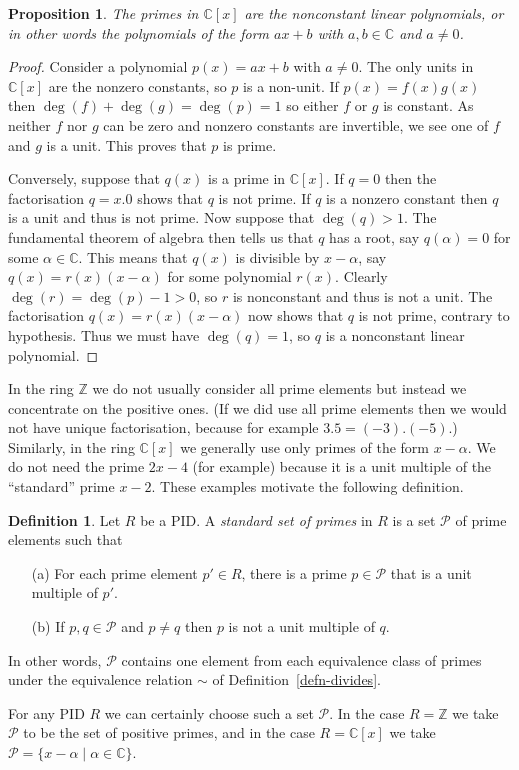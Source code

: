 \documentclass{amsart}
\newcommand{\Z}         {{\mathbb{Z}}}
\newcommand{\st}        {\;|\;}
\newcommand{\CP}        {{\mathcal{P}}}
\newcommand{\C}         {{\mathbb{C}}}
\newcommand{\al}        {\alpha}
\renewcommand{\:}{\colon}
\newtheorem{proposition}[theorem]{Proposition}
\theoremstyle{definition}
\newtheorem{definition}[theorem]{Definition}
\begin{document}
\begin{proposition}\label{prop-Cx-prime}
 The primes in $\C[x]$ are the nonconstant linear polynomials, or in
 other words the polynomials of the form $ax+b$ with $a,b\in\C$ and
 $a\neq 0$.
\end{proposition}
\begin{proof}
 Consider a polynomial $p(x)=ax+b$ with $a\neq 0$.  The only units in
 $\C[x]$ are the nonzero constants, so $p$ is a non-unit.  If
 $p(x)=f(x)g(x)$ then $\deg(f)+\deg(g)=\deg(p)=1$ so either $f$ or $g$
 is constant.  As neither $f$ nor $g$ can be zero and nonzero
 constants are invertible, we see one of $f$ and $g$ is a unit.  This
 proves that $p$ is prime.

 Conversely, suppose that $q(x)$ is a prime in $\C[x]$.  If $q=0$ then
 the factorisation $q=x.0$ shows that $q$ is not prime.  If $q$ is a
 nonzero constant then $q$ is a unit and thus is not prime.  Now
 suppose that $\deg(q)>1$.  The fundamental theorem of algebra then
 tells us that $q$ has a root, say $q(\al)=0$ for some $\al\in\C$.
 This means that $q(x)$ is divisible by $x-\al$, say
 $q(x)=r(x)(x-\al)$ for some polynomial $r(x)$.  Clearly
 $\deg(r)=\deg(p)-1>0$, so $r$ is nonconstant and thus is not a unit.
 The factorisation $q(x)=r(x)(x-\al)$ now shows that $q$ is not prime,
 contrary to hypothesis.  Thus we must have $\deg(q)=1$, so $q$ is a
 nonconstant linear polynomial.
\end{proof}

In the ring $\Z$ we do not usually consider all prime elements but
instead we concentrate on the positive ones.  (If we did use all prime
elements then we would not have unique factorisation, because for
example $3.5=(-3).(-5)$.)  Similarly, in the ring $\C[x]$ we generally
use only primes of the form $x-\al$.  We do not need the prime $2x-4$
(for example) because it is a unit multiple of the ``standard'' prime
$x-2$.  These examples motivate the following definition.
\begin{definition}
 Let $R$ be a PID.  A \emph{standard set of primes} in $R$ is a set
 $\CP$ of prime elements such that
 \begin{itemize}
 \item[(a)] For each prime element $p'\in R$, there is a prime
  $p\in\CP$ that is a unit multiple of $p'$.
 \item[(b)] If $p,q\in\CP$ and $p\neq q$ then $p$ is not a unit
  multiple of $q$.
 \end{itemize}
 In other words, $\CP$ contains one element from each equivalence
 class of primes under the equivalence relation $\sim$ of
 Definition~\ref{defn-divides}.  
\end{definition}
For any PID $R$ we can certainly choose such a set $\CP$.  In the case
$R=\Z$ we take $\CP$ to be the set of positive primes, and in the case
$R=\C[x]$ we take $\CP=\{x-\al\st \al\in\C\}$.
\end{document}
